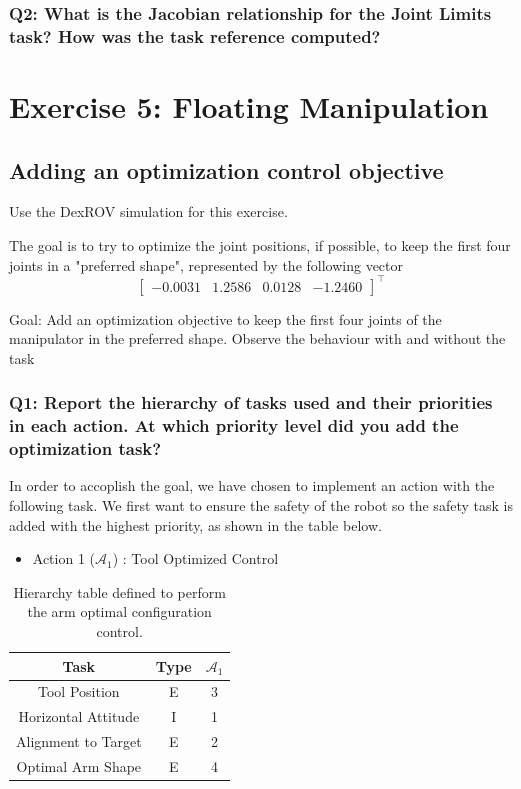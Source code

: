 \documentclass{article}
\begin{document}
\subsubsection{Q2: What is the Jacobian relationship for the Joint Limits task? How was the task reference computed?}

\clearpage
\section{Exercise 5: Floating Manipulation}
\subsection{Adding an optimization control objective}
Use the DexROV simulation for this exercise.

The goal is to try to optimize the joint positions, if possible, to keep the first four joints in a "preferred shape", represented by the following vector
\begin{displaymath}
\begin{bmatrix}-0.0031 & 1.2586 & 0.0128 & -1.2460 \end{bmatrix}^\top
\end{displaymath}

Goal: Add an optimization objective to keep the first four joints of the manipulator in the preferred shape. Observe the behaviour with and without the task

\subsubsection{Q1: Report the hierarchy of tasks used and their priorities in each action. At which priority level did you add the optimization task?}

In order to accoplish the goal, we have chosen to implement an action with the following task. We first want to ensure the safety of the robot so the safety task is added with the highest priority, as shown in the table below. 

\begin{table}[htb]
	\caption{Hierarchy table defined to perform the arm optimal configuration control.}
	\begin{itemize}
		\item Action 1 ($\mathcal{A}_{1}$) : Tool Optimized Control
	\end{itemize}
	\label{tb5:ex4.1.1HierarchyTable}
	\begin{center}
		\footnotesize
		\begin{tabular}{ccc}
			\toprule
			Task & Type & $\mathcal{A}_{1}$  \\
			\midrule
			Tool Position                   & E & 3  \\
			\hdashline
			Horizontal Attitude             & I & 1  \\
			\hdashline
			Alignment to Target           	& E & 2  \\
			\hdashline
			Optimal Arm Shape				& E & 4  \\
			\bottomrule
		\end{tabular}
	\end{center}
\end{table}
\end{document}
